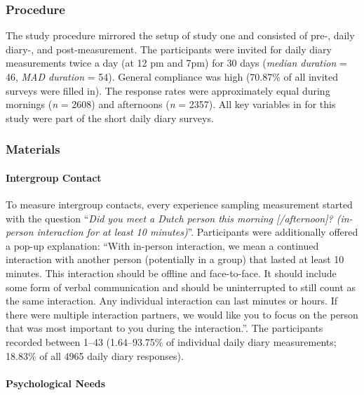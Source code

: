 \subsubsection{Procedure}

The study procedure mirrored the setup of study one and consisted of
pre-, daily diary-, and post-measurement. The participants were invited
for daily diary measurements twice a day (at 12 pm and 7pm) for 30 days
(\textit{median duration} = 46, \textit{MAD duration} = 54). General
compliance was high (70.87\% of all invited surveys were filled in). The
response rates were approximately equal during mornings (\textit{n} =
2608) and afternoons (\textit{n} = 2357). All key variables in for this
study were part of the short daily diary surveys.

\subsubsection{Materials}

\paragraph{Intergroup Contact}

To measure intergroup contacts, every experience sampling measurement
started with the question
``\textit{Did you meet a Dutch person this morning [/afternoon]? (in-person interaction for at least 10 minutes)}''.
Participants were additionally offered a pop-up explanation: ``With
in-person interaction, we mean a continued interaction with another
person (potentially in a group) that lasted at least 10 minutes. This
interaction should be offline and face-to-face. It should include some
form of verbal communication and should be uninterrupted to still count
as the same interaction. Any individual interaction can last minutes or
hours. If there were multiple interaction partners, we would like you to
focus on the person that was most important to you during the
interaction.''. The participants recorded between 1--43 (1.64--93.75\%
of individual daily diary measurements; 18.83\% of all 4965 daily diary
responses).

\paragraph{Psychological Needs}

